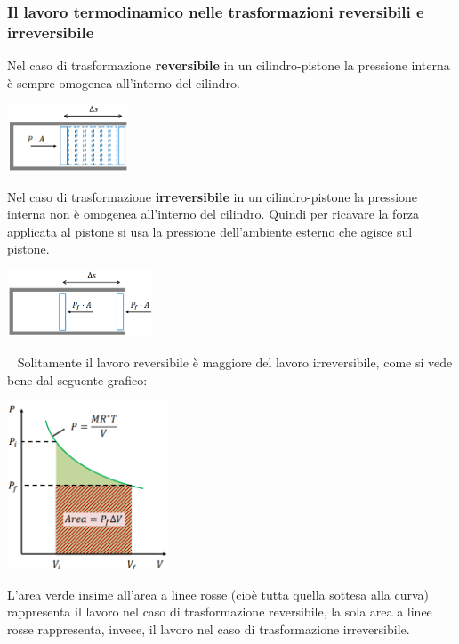 \subsubsection{Il lavoro termodinamico nelle trasformazioni reversibili e irreversibile}
Nel caso di trasformazione \textbf{reversibile} in un cilindro-pistone la pressione interna è sempre omogenea all'interno del cilindro.
\begin{center}
    \includegraphics[height=2cm]{../L03/img2.PNG}
\end{center}
Nel caso di trasformazione \textbf{irreversibile} in un cilindro-pistone la pressione interna non è omogenea all'interno del cilindro. Quindi per ricavare la forza applicata al pistone si usa la pressione dell'ambiente esterno che agisce sul pistone.
\begin{center}
    \includegraphics[height=2cm]{../L03/img3.PNG}
\end{center}
\ \newline
\newline
Solitamente il lavoro reversibile è maggiore del lavoro irreversibile, come si vede bene dal seguente grafico:
\begin{center}
    \includegraphics[height=5cm]{../L03/img4.PNG}
\end{center}
L'area verde insime all'area a linee rosse (cioè tutta quella sottesa alla curva) rappresenta il lavoro nel caso di trasformazione reversibile, la sola area a linee rosse rappresenta, invece, il lavoro nel caso di trasformazione irreversibile.
